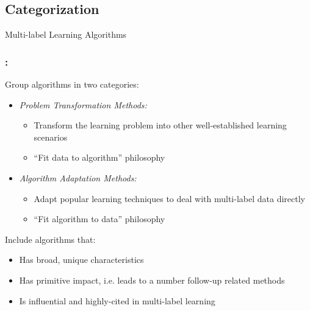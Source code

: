 \documentclass{beamer}
\begin{document}
\subsection{Categorization}
\begin{frame}
\Huge{\centerline{Multi-label Learning Algorithms}}
\end{frame}
\begin{frame}
\frametitle{\insertsection : \insertsubsection}

Group algorithms in two categories:
\begin{itemize}
\item \emph{Problem Transformation Methods:}

\begin{itemize}
\item Transform the learning problem into other well-established learning scenarios
\item ``Fit data to algorithm'' philosophy
\end{itemize}

\item \emph{Algorithm Adaptation Methods:}
\begin{itemize}
\item Adapt popular learning techniques to deal with multi-label data directly
\item ``Fit algorithm to data'' philosophy
\end{itemize}
\end{itemize}

Include algorithms that:
\begin{itemize}
\item Has broad, unique characteristics
\item Has primitive impact, i.e. leads to a number follow-up related methods
\item Is influential and highly-cited in multi-label learning
\end{itemize}

\end{frame}
\end{document}
